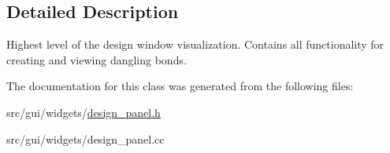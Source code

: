 \subsection{Detailed Description}
Highest level of the design window visualization. Contains all functionality for creating and viewing dangling bonds. 

The documentation for this class was generated from the following files\+:\begin{DoxyCompactItemize}
\item 
src/gui/widgets/\hyperlink{design__panel_8h}{design\+\_\+panel.\+h}\item 
src/gui/widgets/design\+\_\+panel.\+cc\end{DoxyCompactItemize}
